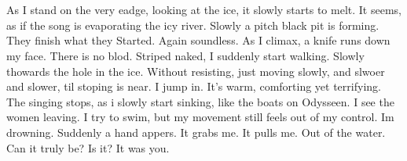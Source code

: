 \documentclass[]{article}
\begin{document}
\\ \\
As I stand on the very eadge, looking at the ice, it slowly starts to melt. It seems, as if the song is evaporating the icy river. Slowly a pitch black pit is forming. They finish what they Started. Again soundless. As I climax, a knife runs down my face. There is no blod. Striped naked, I suddenly start walking. Slowly thowards the hole in the ice. Without resisting, just moving slowly, and slwoer and slower, til stoping is near. I jump in. It's warm, comforting yet terrifying. The singing stops, as i slowly start sinking, like the boats on Odysseen. I see the women leaving. I try to swim, but my movement still feels out of my control. Im drowning. Suddenly a hand appers. It grabs me. It pulls me. Out of the water. Can it truly be? Is it? It was you.
\end{document}
